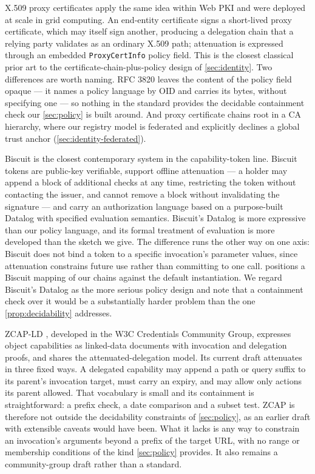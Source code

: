 \documentclass[11pt,a4paper]{article}
\begin{document}
X.509 proxy certificates \citep{rfc3820} apply the same idea within Web
PKI and were deployed at scale in grid computing. An end-entity
certificate signs a short-lived proxy certificate, which may itself sign
another, producing a delegation chain that a relying party validates as
an ordinary X.509 path; attenuation is expressed through an embedded
\texttt{ProxyCertInfo} policy field. This is the closest classical prior
art to the certificate-chain-plus-policy design of \cref{sec:identity}.
Two differences are worth naming. RFC 3820 leaves the content of the
policy field opaque --- it names a policy language by OID and carries
its bytes, without specifying one --- so nothing in the standard
provides the decidable containment check our \cref{sec:policy} is built
around. And proxy certificate chains root in a CA hierarchy, where our
registry model is federated and explicitly declines a global trust
anchor (\cref{sec:identity-federated}).

Biscuit \citep{biscuit-spec} is the closest contemporary system in the
capability-token line. Biscuit tokens are public-key verifiable, support
offline attenuation --- a holder may append a block of additional checks
at any time, restricting the token without contacting the issuer, and
cannot remove a block without invalidating the signature --- and carry
an authorization language based on a purpose-built Datalog with
specified evaluation semantics. Biscuit's Datalog is more expressive
than our policy language, and its formal treatment of evaluation is more
developed than the sketch we give. The difference runs the other way on
one axis: Biscuit does not bind a token to a specific invocation's
parameter values, since attenuation constrains future use rather than
committing to one call.  positions a Biscuit
mapping of our chains against the default instantiation. We regard Biscuit's Datalog as the more serious policy
design and note that a containment check over it would be a
substantially harder problem than the one \cref{prop:decidability}
addresses.

ZCAP-LD \citep{zcapld}, developed in the W3C Credentials Community
Group, expresses object capabilities as linked-data documents with
invocation and delegation proofs, and shares the attenuated-delegation
model. Its current draft attenuates in three fixed ways. A delegated
capability may append a path or query suffix to its parent's invocation
target, must carry an expiry, and may allow only actions its parent
allowed. That vocabulary is small and its containment is
straightforward: a prefix check, a date comparison and a subset test.
ZCAP is therefore not outside the decidability constraints of
\cref{sec:policy}, as an earlier draft with extensible caveats would
have been. What it lacks is any way to constrain an invocation's
arguments beyond a prefix of the target URL, with no range or membership
conditions of the kind \cref{sec:policy} provides. It also remains a
community-group draft rather than a standard.
\end{document}
